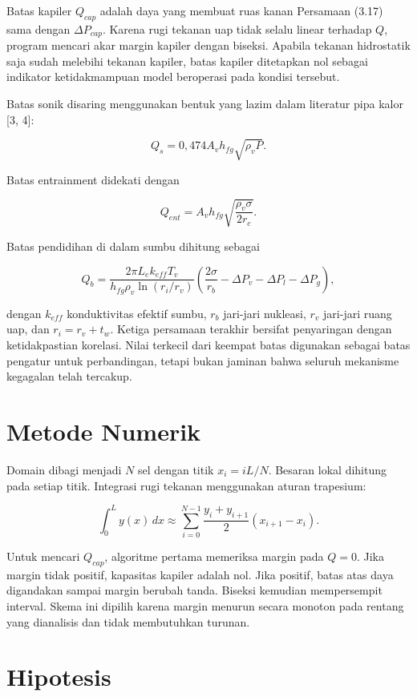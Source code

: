 \documentclass[
  12pt,a4paper,oneside]{report}
\begin{document}
Batas kapiler \(Q_{cap}\) adalah daya yang membuat ruas kanan Persamaan
(3.17) sama dengan \(\Delta P_{cap}\). Karena rugi tekanan uap tidak
selalu linear terhadap \(Q\), program mencari akar margin kapiler dengan
biseksi. Apabila tekanan hidrostatik saja sudah melebihi tekanan
kapiler, batas kapiler ditetapkan nol sebagai indikator ketidakmampuan
model beroperasi pada kondisi tersebut.

Batas sonik disaring menggunakan bentuk yang lazim dalam literatur pipa
kalor {[}3, 4{]}:

\[
Q_s=0{,}474 A_v h_{fg}\sqrt{\rho_vP}.
\tag{3.19}\]

Batas entrainment didekati dengan

\[
Q_{ent}=A_v h_{fg}\sqrt{\frac{\rho_v\sigma}{2r_c}}.
\tag{3.20}\]

Batas pendidihan di dalam sumbu dihitung sebagai

\[
Q_b=\frac{2\pi L_e k_{eff}T_v}{h_{fg}\rho_v\ln(r_i/r_v)}
\left(\frac{2\sigma}{r_b}-\Delta P_v-\Delta P_l-\Delta P_g\right),
\tag{3.21}\]

dengan \(k_{eff}\) konduktivitas efektif sumbu, \(r_b\) jari-jari
nukleasi, \(r_v\) jari-jari ruang uap, dan \(r_i=r_v+t_w\). Ketiga
persamaan terakhir bersifat penyaringan dengan ketidakpastian korelasi.
Nilai terkecil dari keempat batas digunakan sebagai batas pengatur untuk
perbandingan, tetapi bukan jaminan bahwa seluruh mekanisme kegagalan
telah tercakup.

\hypertarget{metode-numerik}{%
\section{Metode Numerik}\label{metode-numerik}}

Domain dibagi menjadi \(N\) sel dengan titik \(x_i=iL/N\). Besaran lokal
dihitung pada setiap titik. Integrasi rugi tekanan menggunakan aturan
trapesium:

\[
\int_0^L y(x)\,dx\approx\sum_{i=0}^{N-1}\frac{y_i+y_{i+1}}{2}(x_{i+1}-x_i).
\tag{3.22}\]

Untuk mencari \(Q_{cap}\), algoritme pertama memeriksa margin pada
\(Q=0\). Jika margin tidak positif, kapasitas kapiler adalah nol. Jika
positif, batas atas daya digandakan sampai margin berubah tanda. Biseksi
kemudian mempersempit interval. Skema ini dipilih karena margin menurun
secara monoton pada rentang yang dianalisis dan tidak membutuhkan
turunan.

\hypertarget{hipotesis}{%
\section{Hipotesis}\label{hipotesis}}
\end{document}
